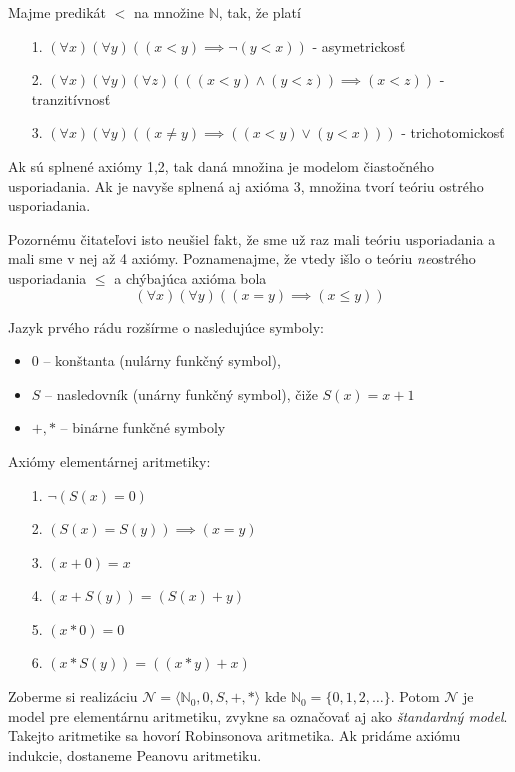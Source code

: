 \begin{priklad}
    Majme predikát $<$ na množine $\mathbb{N}$, tak, že platí
    \begin{itemize}
    \item[1.] $(\forall x)(\forall y) ((x < y) \implies \neg (y < x))$
    - asymetrickosť
    \item[2.] $(\forall x)(\forall y)(\forall z) (((x<y) \land (y<z)) \implies
        (x<z))$ - tranzitívnosť
    \item[3.] $(\forall x)(\forall y)( (x\not=y) \implies ((x<y) \lor (y<x)))$ -
     trichotomickosť
    \end{itemize}
    Ak sú splnené axiómy 1,2, tak daná množina je modelom čiastočného
    usporiadania. Ak je
    navyše splnená aj axióma 3, množina tvorí teóriu ostrého
    usporiadania.
\end{priklad}
\begin{poznamka}
    Pozornému čitateľovi isto neušiel fakt, že sme už raz mali teóriu
    usporiadania a mali sme v nej až 4 axiómy. Poznamenajme, že vtedy
    išlo o teóriu \emph{ne}ostrého usporiadania $\le$ a chýbajúca
    axióma bola
    \begin{equation*}
        (\forall x)(\forall y) ((x=y) \implies (x \le y))
    \end{equation*}
\end{poznamka}

\begin{priklad}
    Jazyk prvého rádu rozšírme o nasledujúce symboly:
    \begin{itemize}
        \item $0$ -- konštanta (nulárny funkčný symbol),
        \item $S$ -- nasledovník (unárny funkčný symbol), čiže $S(x)=x+1$
        \item $+,*$ -- binárne funkčné symboly
    \end{itemize}
    Axiómy elementárnej aritmetiky:
    \begin{itemize}
        \item[1.] $\neg (S(x) = 0)$
        \item[2.] $(S(x) = S(y)) \implies (x=y)$
        \item[3.] $(x+0) = x$
        \item[4.] $(x+S(y)) = (S(x) + y)$
        \item[5.] $(x * 0) = 0$
        \item[6.] $(x * S(y)) = ((x*y)+x)$
    \end{itemize}
    Zoberme si realizáciu 
        $\mathcal{N}=\langle \mathbb{N}_0,0,S,+,* \rangle$ kde  
        $\mathbb{N}_0 = \{0,1,2,\dots\}$.
        Potom $\mathcal{N}$ je model pre elementárnu aritmetiku,
        zvykne sa označovať aj ako \emph{štandardný model}.
        Takejto aritmetike sa hovorí Robinsonova aritmetika.
        Ak pridáme axiómu indukcie, dostaneme Peanovu aritmetiku.
\end{priklad}

